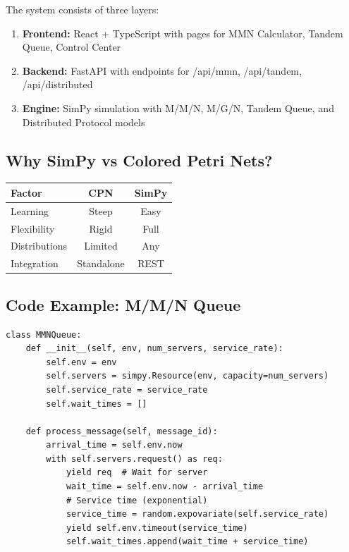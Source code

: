 \documentclass[11pt,a4paper]{article}
\begin{document}
The system consists of three layers:

\begin{enumerate}[leftmargin=*]
\item \textbf{Frontend:} React + TypeScript with pages for MMN Calculator, Tandem Queue, Control Center
\item \textbf{Backend:} FastAPI with endpoints for /api/mmn, /api/tandem, /api/distributed
\item \textbf{Engine:} SimPy simulation with M/M/N, M/G/N, Tandem Queue, and Distributed Protocol models
\end{enumerate}

\subsection{Why SimPy vs Colored Petri Nets?}

\begin{table}[h]
\centering
\footnotesize
\begin{tabular}{lcc}
\toprule
\textbf{Factor} & \textbf{CPN} & \textbf{SimPy} \\
\midrule
Learning & Steep & Easy \\
Flexibility & Rigid & Full \\
Distributions & Limited & Any \\
Integration & Standalone & REST \\
\bottomrule
\end{tabular}
\end{table}

\subsection{Code Example: M/M/N Queue}

\begin{lstlisting}[style=python, caption={SimPy M/M/N Queue Implementation}]
class MMNQueue:
    def __init__(self, env, num_servers, service_rate):
        self.env = env
        self.servers = simpy.Resource(env, capacity=num_servers)
        self.service_rate = service_rate
        self.wait_times = []
    
    def process_message(self, message_id):
        arrival_time = self.env.now
        with self.servers.request() as req:
            yield req  # Wait for server
            wait_time = self.env.now - arrival_time
            # Service time (exponential)
            service_time = random.expovariate(self.service_rate)
            yield self.env.timeout(service_time)
            self.wait_times.append(wait_time + service_time)
\end{lstlisting}
\end{document}
